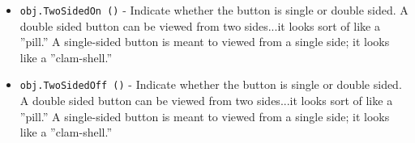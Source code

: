 \begin{itemize}
\item  \verb|obj.TwoSidedOn ()| -  Indicate whether the button is single or double sided. A double sided
 button can be viewed from two sides...it looks sort of like a ''pill.''
 A single-sided button is meant to viewed from a single side; it looks 
 like a ''clam-shell.''

\item  \verb|obj.TwoSidedOff ()| -  Indicate whether the button is single or double sided. A double sided
 button can be viewed from two sides...it looks sort of like a ''pill.''
 A single-sided button is meant to viewed from a single side; it looks 
 like a ''clam-shell.''

\end{itemize}
